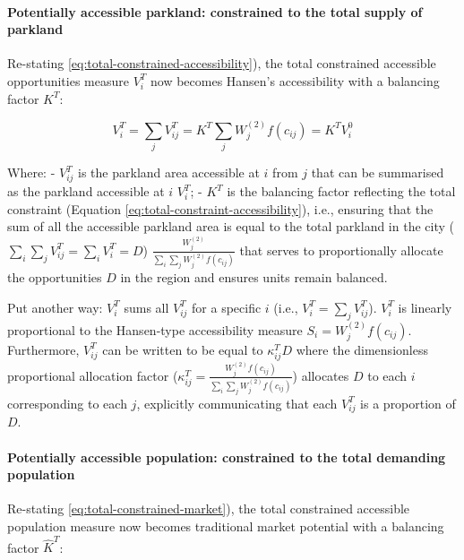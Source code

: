 \documentclass[
11pt, %
oneside, %
english, %
singlespacing, %
]{macthesis} %
\begin{document}
\paragraph{Potentially accessible parkland: constrained to the total supply of parkland}\label{potentially-accessible-parkland-constrained-to-the-total-supply-of-parkland}

Re-stating \ref{eq:total-constrained-accessibility}), the total constrained accessible opportunities measure \(V^T_{i}\) now becomes Hansen's accessibility with a balancing factor \(K^T\):

\begin{equation}
\label{eq:total-constrained-accessibility}
V^T_i = \sum_j V^T_{ij} = K^T \sum_j W^{(2)}_j f(c_{ij}) = K^T V^0_i
\end{equation} 

Where:
- \(V^T_{ij}\) is the parkland area accessible at \(i\) from \(j\) that can be summarised as the parkland accessible at \(i\) \(V^T_{i}\);
- \(K^T\) is the balancing factor reflecting the total constraint (Equation \ref{eq:total-constraint-accessibility}), i.e., ensuring that the sum of all the accessible parkland area is equal to the total parkland in the city (\(\sum_i\sum_j V^T_{ij} = \sum_i V^T_{i} = D\)) \(\frac{W^{(2)}_j}{\sum_i\sum_j W^{(2)}_jf(c_{ij})}\) that serves to proportionally allocate the opportunities \(D\) in the region and ensures units remain balanced.

Put another way: \(V^T_i\) sums all \(V^T_{ij}\) for a specific \(i\) (i.e., \(V^T_i = \sum_j V^T_{ij}\)). \(V^T_i\) is linearly proportional to the Hansen-type accessibility measure \(S_i = W^{(2)}_jf(c_{ij})\). Furthermore, \(V_{ij}^T\) can be written to be equal to \(\kappa_{ij}^T D\) where the dimensionless proportional allocation factor (\(\kappa_{ij}^T = \frac{W_j^{(2)} f(c_{ij})}{\sum_i\sum_j W^{(2)}_jf(c_{ij})}\)) allocates \(D\) to each \(i\) corresponding to each \(j\), explicitly communicating that each \(V_{ij}^T\) is a proportion of \(D\).

\paragraph{Potentially accessible population: constrained to the total demanding population}\label{potentially-accessible-population-constrained-to-the-total-demanding-population}

Re-stating \ref{eq:total-constrained-market}), the total constrained accessible population measure now becomes traditional market potential with a balancing factor \(\hat K^T\):
\end{document}
